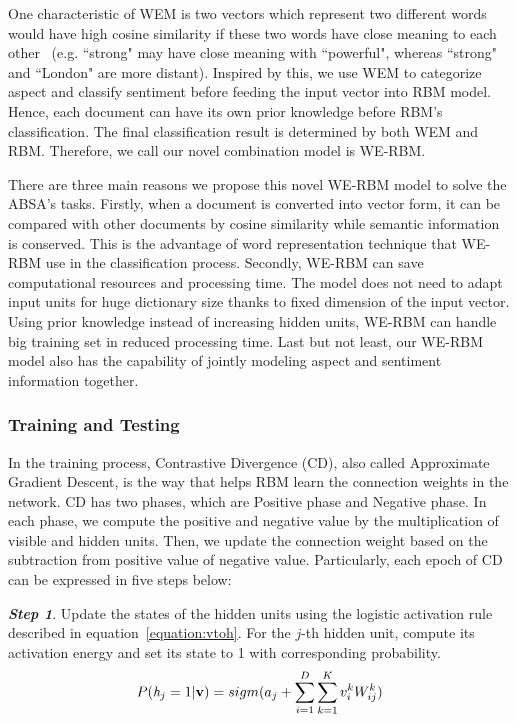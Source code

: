 One characteristic of WEM is two vectors which represent two different words would have high cosine similarity if these two words have close meaning to each other~\cite{rehurek_lrec_word2vec,Milokov_word2vec} (e.g. ``strong" may have close meaning with ``powerful", whereas ``strong" and ``London" are more distant).
Inspired by this, we use WEM to categorize aspect and classify sentiment before feeding the input vector into RBM model.
Hence, each document can have its own prior knowledge before RBM's classification.
The final classification result is determined by both WEM and RBM.
Therefore, we call our novel combination model is WE-RBM.

There are three main reasons we propose this novel WE-RBM model to solve the ABSA's tasks.
Firstly, when a document is converted into vector form, it can be compared with other documents by cosine similarity while semantic information is conserved.
This is the advantage of word representation technique that WE-RBM use in the classification process.
Secondly, WE-RBM can save computational resources and processing time.
The model does not need to adapt input units for huge dictionary size thanks to fixed dimension of the input vector.
Using prior knowledge instead of increasing hidden units, WE-RBM can handle big training set in reduced processing time.
Last but not least, our WE-RBM model also has the capability of jointly modeling aspect and sentiment information together.

\subsubsection{Training and Testing}
In the training process, Contrastive Divergence (CD), also called Approximate Gradient Descent, is the way that helps RBM learn the connection weights in the network.
CD has two phases, which are Positive phase and Negative phase.
In each phase, we compute the positive and negative value by the multiplication of visible and hidden units.
Then, we update the connection weight based on the subtraction from positive value of negative value.
Particularly, each epoch of CD can be expressed in five steps below:

\textbf{\emph{Step 1}}.
Update the states of the hidden units using the logistic activation rule described in equation~\ref{equation:vtoh}.
For the $j$-th hidden unit, compute its activation energy and set its state to 1 with corresponding probability.
\begin{equation} \label{equation:vtoh}
P(\emph{h}_j=1| \textbf{v})=sigm(a_j+\sum^D_{i=1}\sum^K_{k=1}v^k_iW^k_{ij})
\end{equation}

